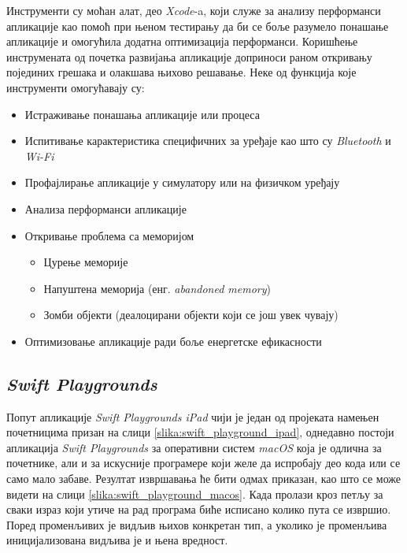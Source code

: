 \documentclass[12pt,oneside]{memoir}
\begin{document}
\indent Инструменти су моћан алат, део \textit{Xcode}-a, који служе за анализу перформанси апликације као помоћ при њеном тестирању да би се боље разумело понашање апликације и омогућила додатна оптимизација перформанси. Коришћење инструмената од почетка развијања апликације доприноси раном откривању појединих грешака и олакшава њихово решавање. 
Неке од функција које инструменти омогућавају су:
\begin{itemize}
    \item Истраживање понашања апликације или процеса
    \item Испитивање карактеристика специфичних за уређаје као што су \textit{Bluetooth} и \textit{Wi-Fi}
    \item Профајлирање апликације у симулатору или на физичком уређају
    \item Анализа перформанси апликације
    \item Откривање проблема са меморијом
    
    \begin{itemize}
        \item Цурење меморије
        \item Напуштена меморија (енг. \textit{abandoned memory})
        \item Зомби објекти (деалоцирани објекти који се још увек чувају)
    \end{itemize}
    
    \item Оптимизовање апликације ради боље енергетске ефикасности
\end{itemize}

\subsection{\textit{Swift Playgrounds}}
\indent Попут апликације \textit{Swift Playgrounds iPad} чији је један од пројеката намењен почетницима призан на слици \ref{slika:swift_playground_ipad}, однедавно постоји апликација \textit{Swift Playgrounds} за оперативни систем \textit{macOS} која је одлична за почетнике, али и за искусније програмере који желе да испробају део кода или се само мало забаве. Резултат извршавања ће бити одмах приказан, као што се може видети на слици \ref{slika:swift_playground_macos}. Када пролази кроз петљу за сваки израз који утиче на рад програма биће исписано колико пута се извршио. Поред променљивих је видљив њихов конкретан тип, а уколико је променљива иницијализована видљива је и њена вредност.
\end{document}

